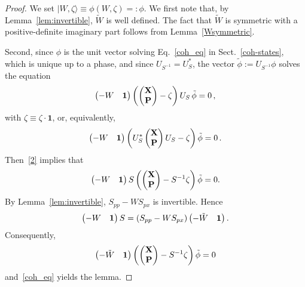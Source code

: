 \documentclass[11pt]{article}
\begin{document}
\begin{proof}
We set $\vert W, \zeta \rangle \equiv \phi(W, \zeta) =: \phi$. We first note that, by Lemma~\ref{lem:invertible}, $\tilde W$ 
is well defined. The fact that $ \tilde W $ is symmetric with a positive-definite imaginary part follows 
from Lemma~\ref{Wsymmetric}.

Second, since $\phi$ is the unit vector solving Eq.~\eqref{coh_eq} in Sect.~\ref{coh-states}, which is unique up to a phase, and since $U_{S^{-1}}=U_S^*$, the vector $\tilde\phi:=U_{S^{-1}}\phi$ solves the equation 
$$ \begin{pmatrix} -W & {\bf{1}} \end{pmatrix} 
\left( \begin{pmatrix} \mathbf X\\\mathbf P \end{pmatrix} -\zeta\right)U_S\,\tilde\phi=0\,,$$
with $\zeta \equiv \zeta\cdot \mathbf{1}$, or, equivalently,
$$\begin{pmatrix} -W & {\bf{1}} \end{pmatrix} \left( U_S^*\begin{pmatrix} \mathbf X\\\mathbf P \end{pmatrix}U_S -\zeta \right)\tilde\phi=0\,.$$
Then~\eqref{2} implies that
$$\begin{pmatrix} -W & {\bf{1}} \end{pmatrix} S\left( \begin{pmatrix} \mathbf X\\\mathbf P \end{pmatrix} 
-S^{-1}\zeta\right) \tilde\phi=0.$$
By Lemma~\ref{lem:invertible}, $S_{pp} - WS_{px} $ is invertible. Hence 
$$ \begin{pmatrix} -W & {\bf{1}} \end{pmatrix} S = (S_{pp} - W S_{px}) \begin{pmatrix} -\tilde W  & {\bf{1}}\end{pmatrix}.$$ 
Consequently,
$$ \begin{pmatrix} -\tilde W  & {\bf{1}}\end{pmatrix} \left(\begin{pmatrix} \mathbf X\\\mathbf P \end{pmatrix}
 -S^{-1}\zeta\right)\tilde\phi = 0$$
and~\eqref{coh_eq} yields the lemma.
\end{proof}
\end{document}
